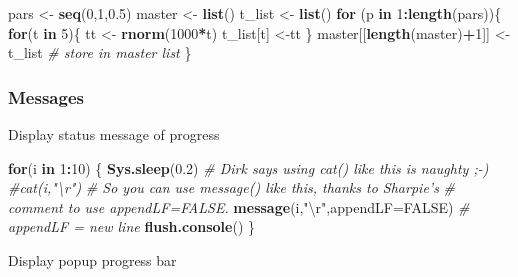 \documentclass[10,portrait]{article}
\newenvironment{Shaded}{\begin{snugshade}}{\end{snugshade}}
\newcommand{\KeywordTok}[1]{\textcolor[rgb]{0.13,0.29,0.53}{\textbf{#1}}}
\newcommand{\DataTypeTok}[1]{\textcolor[rgb]{0.13,0.29,0.53}{#1}}
\newcommand{\DecValTok}[1]{\textcolor[rgb]{0.00,0.00,0.81}{#1}}
\newcommand{\FloatTok}[1]{\textcolor[rgb]{0.00,0.00,0.81}{#1}}
\newcommand{\CharTok}[1]{\textcolor[rgb]{0.31,0.60,0.02}{#1}}
\newcommand{\StringTok}[1]{\textcolor[rgb]{0.31,0.60,0.02}{#1}}
\newcommand{\CommentTok}[1]{\textcolor[rgb]{0.56,0.35,0.01}{\textit{#1}}}
\newcommand{\OtherTok}[1]{\textcolor[rgb]{0.56,0.35,0.01}{#1}}
\newcommand{\ControlFlowTok}[1]{\textcolor[rgb]{0.13,0.29,0.53}{\textbf{#1}}}
\newcommand{\OperatorTok}[1]{\textcolor[rgb]{0.81,0.36,0.00}{\textbf{#1}}}
\newcommand{\NormalTok}[1]{#1}
\begin{document}
\begin{Shaded}
\begin{Highlighting}[]
\NormalTok{pars <-}\StringTok{ }\KeywordTok{seq}\NormalTok{(}\DecValTok{0}\NormalTok{,}\DecValTok{1}\NormalTok{,}\FloatTok{0.5}\NormalTok{)}
\NormalTok{master <-}\StringTok{ }\KeywordTok{list}\NormalTok{()}
\NormalTok{t_list <-}\StringTok{ }\KeywordTok{list}\NormalTok{()}
\ControlFlowTok{for}\NormalTok{ (p }\ControlFlowTok{in} \DecValTok{1}\OperatorTok{:}\KeywordTok{length}\NormalTok{(pars))\{}
  \ControlFlowTok{for}\NormalTok{(t }\ControlFlowTok{in} \DecValTok{5}\NormalTok{)\{}
\NormalTok{    tt <-}\StringTok{ }\KeywordTok{rnorm}\NormalTok{(}\DecValTok{1000}\OperatorTok{*}\NormalTok{t)}
\NormalTok{    t_list[t] <-tt }
\NormalTok{  \}}
\NormalTok{  master[[}\KeywordTok{length}\NormalTok{(master)}\OperatorTok{+}\DecValTok{1}\NormalTok{]] <-}\StringTok{ }\NormalTok{t_list }\CommentTok{# store in master list}
\NormalTok{\} }
\end{Highlighting}
\end{Shaded}

\subsubsection{Messages}\label{messages}

Display status message of progress

\begin{Shaded}
\begin{Highlighting}[]
\ControlFlowTok{for}\NormalTok{(i }\ControlFlowTok{in} \DecValTok{1}\OperatorTok{:}\DecValTok{10}\NormalTok{) \{}
  \KeywordTok{Sys.sleep}\NormalTok{(}\FloatTok{0.2}\NormalTok{)}
  \CommentTok{# Dirk says using cat() like this is naughty ;-)}
  \CommentTok{#cat(i,"\textbackslash{}r")}
  \CommentTok{# So you can use message() like this, thanks to Sharpie's}
  \CommentTok{# comment to use appendLF=FALSE.}
  \KeywordTok{message}\NormalTok{(i,}\StringTok{"}\CharTok{\textbackslash{}r}\StringTok{"}\NormalTok{,}\DataTypeTok{appendLF=}\OtherTok{FALSE}\NormalTok{) }\CommentTok{# appendLF = new line }
  \KeywordTok{flush.console}\NormalTok{()}
\NormalTok{\}}
\end{Highlighting}
\end{Shaded}

Display popup progress bar
\end{document}
